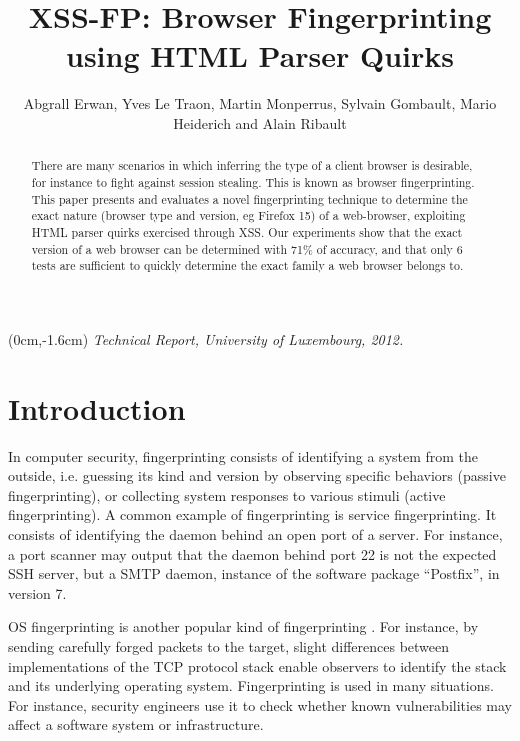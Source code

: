 \documentclass[10pt]{IEEEtran}
\title{XSS-FP: Browser Fingerprinting using HTML Parser Quirks}
\author{Abgrall Erwan, Yves Le Traon, Martin Monperrus, Sylvain Gombault, Mario Heiderich and Alain Ribault}
\date{}
\begin{document}
\maketitle

\begin{textblock*}{\textwidth}(0cm,-1.6cm)
\center\em\noindent Technical Report, University of Luxembourg, 2012.
\end{textblock*}

\begin{abstract}
There are many scenarios in which inferring the type of  a client browser is desirable, for instance to fight against session stealing.
This is known as browser fingerprinting. 
This paper presents and evaluates a novel fingerprinting 
technique to determine the exact nature (browser type and version, eg Firefox 15) of a web-browser, exploiting HTML parser quirks exercised through XSS.
Our experiments show that the exact version of a web browser can be determined with 71\% of 
accuracy, and that only 6 tests are sufficient to quickly determine the exact family a web 
browser belongs to. 
\end{abstract}
\section{Introduction}
\label{sec:intro}
In computer security, fingerprinting consists of identifying a system from the
outside, i.e. guessing its kind and version \cite{adhami2001fingerprinting}
 by observing 
specific behaviors (passive fingerprinting), or collecting system responses to
various stimuli (active fingerprinting). A common example of fingerprinting is
service fingerprinting. It consists of identifying the daemon behind an open
port of a server. For instance, a port scanner may output that the daemon 
behind port 22 is not the expected SSH server, but a SMTP daemon, instance of 
the software package ``Postfix'', in version 7. 




OS fingerprinting is another popular kind of fingerprinting \cite{greenwald2007toward}. 
For instance, by sending carefully forged packets to the target, slight differences
between implementations of the TCP protocol stack enable observers to identify the
stack and its underlying operating system. 
Fingerprinting is used in many situations. 
For instance, security engineers use it to check whether known vulnerabilities may affect a software system
or infrastructure.
\end{document}
